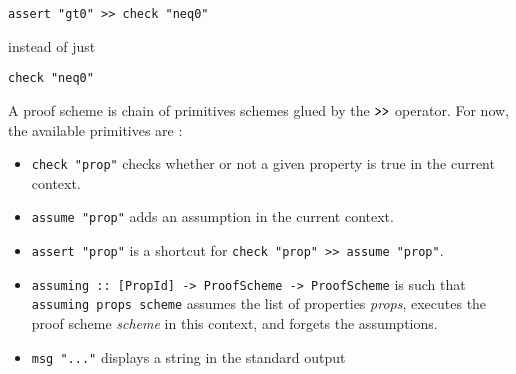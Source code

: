 \begin{lstlisting}[frame=single]
assert "gt0" >> check "neq0"
\end{lstlisting}


instead of just 
\begin{lstlisting}[frame=single] 
  check "neq0" 
\end{lstlisting}
A proof scheme is chain of
primitives schemes glued by the $\texttt{\textgreater{}\textgreater{}}$
operator. For now, the available primitives are :

\begin{itemize}
\itemsep1pt\parskip0pt
\item
  \texttt{check "prop"} checks whether or not a given property is true
  in the current context.
\item
  \texttt{assume "prop"} adds an assumption in the current context.
\item
  \texttt{assert "prop"} is a shortcut for
  \texttt{check "prop" \textgreater{}\textgreater{} assume "prop"}.
\item
  \texttt{assuming :: {[}PropId{]} -\textgreater{} ProofScheme -\textgreater{} ProofScheme}
  is such that \texttt{assuming props scheme} assumes the list of
  properties \emph{props}, executes the proof scheme \emph{scheme} in
  this context, and forgets the assumptions.
\item
  \texttt{msg "..."} displays a string in the standard output
\end{itemize}
